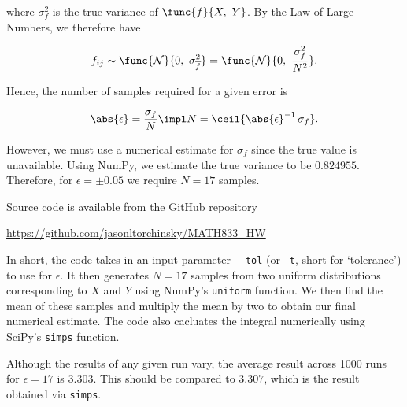 where $\sigma_f^2$ is the true variance of $\func{f}{X,\ Y}$. By the Law of Large Numbers, we therefore have

\begin{equation}
	f_{ij} \sim \func{\mathcal{N}}{0,\ \sigma_{\overline{f}}^2} = \func{\mathcal{N}}{0,\ \frac{\sigma_{f}^2}{N^2}}.
\end{equation}

Hence, the number of samples required for a given error is

\begin{equation}
	\abs{\epsilon} = \frac{\sigma_f}{N} \impl N = \ceil{\abs{\epsilon}^{-1}\,\sigma_f}.
\end{equation}

However, we must use a numerical estimate for $\sigma_f$ since the true value is unavailable. Using NumPy, we estimate the true variance to be $0.824955$. Therefore, for $\epsilon = \pm 0.05$ we require $N = 17$ samples.

Source code is available from the GitHub repository
	
\begin{center}
	\url{https://github.com/jasonltorchinsky/MATH833_HW}
\end{center}

In short, the code takes in an input parameter \texttt{-{}-tol} (or \texttt{-t}, short for `tolerance') to use for $\epsilon$. It then generates $N = 17$ samples from two uniform distributions corresponding to $X$ and $Y$ using NumPy's \texttt{uniform} function. We then find the mean of these samples and multiply the mean by two to obtain our final numerical estimate. The code also cacluates the integral numerically using SciPy's \texttt{simps} function.

Although the results of any given run vary, the average result across 1000 runs for $\epsilon = 17$ is $3.303$. This should be compared to $3.307$, which is the result obtained via \texttt{simps}.